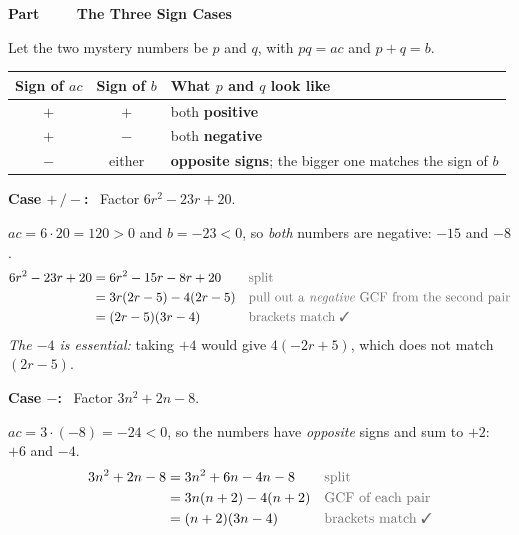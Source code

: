\documentclass[11pt]{article}
\newcounter{partnum}
\newcommand{\partbanner}[1]{%
  \stepcounter{partnum}%
  \vspace{8pt}\par\noindent
  \begin{tcolorbox}[colback=primary,colframe=primary,arc=2pt,
    left=10pt,right=10pt,top=5pt,bottom=5pt,boxrule=0pt]
  {\color{accent}\bfseries Part \thepartnum\ \ \textbullet\ \ }{\color{white}\bfseries\large #1}
  \end{tcolorbox}\par\vspace{3pt}}
\begin{document}
\newpage
\partbanner{The Three Sign Cases}

\begin{keybox}
Let the two mystery numbers be $p$ and $q$, with $pq = ac$ and $p+q = b$.
\begin{center}
\renewcommand{\arraystretch}{1.35}
\begin{tabular}{@{}c c l@{}}
\textbf{Sign of $ac$} & \textbf{Sign of $b$} & \textbf{What $p$ and $q$ look like} \\ \hline
$+$ & $+$ & both \textbf{positive} \\
$+$ & $-$ & both \textbf{negative} \\
$-$ & either & \textbf{opposite signs}; the bigger one matches the sign of $b$ \\
\end{tabular}
\end{center}
\end{keybox}

\begin{exbox}
\textbf{Case $+\,/-$:} \ Factor $6r^2 - 23r + 20$.

\vspace{3pt}
$ac = 6 \cdot 20 = 120 > 0$ and $b = -23 < 0$, so \emph{both} numbers are negative: $-15$ and $-8$.
\begin{align*}
6r^2 - 23r + 20 &= 6r^2 - 15r - 8r + 20 &&\color{reasonclr}\text{split}\\
&= 3r(2r-5) - 4(2r-5) &&\color{reasonclr}\text{pull out a \emph{negative} GCF from the second pair}\\
&= (2r-5)(3r-4) &&\color{reasonclr}\text{brackets match \ding{51}}
\end{align*}
\emph{The $-4$ is essential:} taking $+4$ would give $4(-2r+5)$, which does not match $(2r-5)$.
\end{exbox}

\begin{exbox}
\textbf{Case $-$:} \ Factor $3n^2 + 2n - 8$.

\vspace{3pt}
$ac = 3\cdot(-8) = -24 < 0$, so the numbers have \emph{opposite} signs and sum to $+2$: $+6$ and $-4$.
\begin{align*}
3n^2 + 2n - 8 &= 3n^2 + 6n - 4n - 8 &&\color{reasonclr}\text{split}\\
&= 3n(n+2) - 4(n+2) &&\color{reasonclr}\text{GCF of each pair}\\
&= (n+2)(3n-4) &&\color{reasonclr}\text{brackets match \ding{51}}
\end{align*}
\end{exbox}
\end{document}
